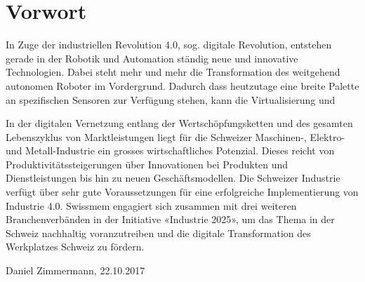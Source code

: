 \chapter*{Vorwort}

In Zuge der industriellen Revolution 4.0, sog. digitale Revolution, entstehen gerade in der Robotik und Automation ständig neue und innovative Technologien. Dabei steht mehr und mehr die Transformation des weitgehend autonomen Roboter im Vordergrund. Dadurch dass heutzutage eine breite Palette an spezifischen Sensoren zur Verfügung stehen, kann die Virtualisierung und   

In der digitalen Vernetzung entlang der Wertschöpfungsketten und des gesamten Lebenszyklus von Marktleistungen liegt für die Schweizer Maschinen-, Elektro- und Metall-Industrie ein grosses wirtschaftliches Potenzial. Dieses reicht von Produktivitätssteigerungen über Innovationen bei Produkten und Dienstleistungen bis hin zu neuen Geschäftsmodellen. Die Schweizer Industrie verfügt über sehr gute Voraussetzungen für eine erfolgreiche Implementierung von Industrie 4.0. Swissmem engagiert sich zusammen mit drei weiteren Branchenverbänden in der Initiative «Industrie 2025», um das Thema in der Schweiz nachhaltig voranzutreiben und die digitale Transformation des Werkplatzes Schweiz zu fördern. 









Daniel Zimmermann, 22.10.2017